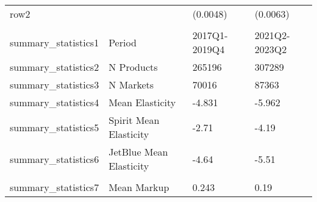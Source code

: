 \begin{tabular}[t]{llll}
\midrule
\hspace{1em}row2 &  & (0.0048) & (0.0063)\\
\addlinespace[0.3em]
\multicolumn{4}{l}{\textbf{Summary Statistics}}\\
\hspace{1em}summary_statistics1 & Period & 2017Q1-2019Q4 & 2021Q2-2023Q2\\
\hspace{1em}summary_statistics2 & N Products & 265196 & 307289\\
\hspace{1em}summary_statistics3 & N Markets & 70016 & 87363\\
\hspace{1em}summary_statistics4 & Mean Elasticity & -4.831 & -5.962\\
\hspace{1em}summary_statistics5 & Spirit Mean Elasticity & -2.71 & -4.19\\
\hspace{1em}summary_statistics6 & JetBlue Mean Elasticity & -4.64 & -5.51\\
\midrule\\
summary_statistics7 & Mean Markup & 0.243 & 0.19\\
\bottomrule
\end{tabular}

